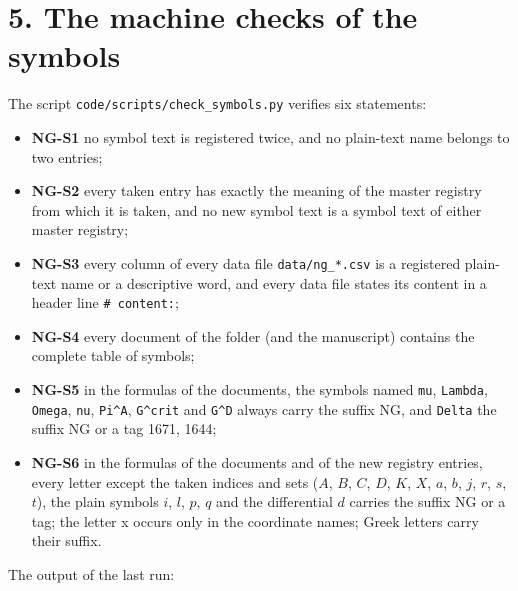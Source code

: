 \documentclass[
  10pt,
]{article}
\providecommand{\tightlist}{%
  \setlength{\itemsep}{0pt}\setlength{\parskip}{0pt}}
\begin{document}
\hypertarget{the-machine-checks-of-the-symbols}{%
\section{5. The machine checks of the
symbols}\label{the-machine-checks-of-the-symbols}}

The script \texttt{code/scripts/check\_symbols.py} verifies six
statements:

\begin{itemize}
\tightlist
\item
  \textbf{NG-S1} no symbol text is registered twice, and no plain-text
  name belongs to two entries;
\item
  \textbf{NG-S2} every taken entry has exactly the meaning of the master
  registry from which it is taken, and no new symbol text is a symbol
  text of either master registry;
\item
  \textbf{NG-S3} every column of every data file \texttt{data/ng\_*.csv}
  is a registered plain-text name or a descriptive word, and every data
  file states its content in a header line \texttt{\#\ content:};
\item
  \textbf{NG-S4} every document of the folder (and the manuscript)
  contains the complete table of symbols;
\item
  \textbf{NG-S5} in the formulas of the documents, the symbols named
  \texttt{mu}, \texttt{Lambda}, \texttt{Omega}, \texttt{nu},
  \texttt{Pi\^{}A}, \texttt{G\^{}crit} and \texttt{G\^{}D} always carry
  the suffix NG, and \texttt{Delta} the suffix NG or a tag 1671, 1644;
\item
  \textbf{NG-S6} in the formulas of the documents and of the new
  registry entries, every letter except the taken indices and sets
  (\(A\), \(B\), \(C\), \(D\), \(K\), \(X\), \(a\), \(b\), \(j\), \(r\),
  \(s\), \(t\)), the plain symbols \(i\), \(l\), \(p\), \(q\) and the
  differential \(d\) carries the suffix NG or a tag; the letter x occurs
  only in the coordinate names; Greek letters carry their suffix.
\end{itemize}

The output of the last run:
\end{document}
